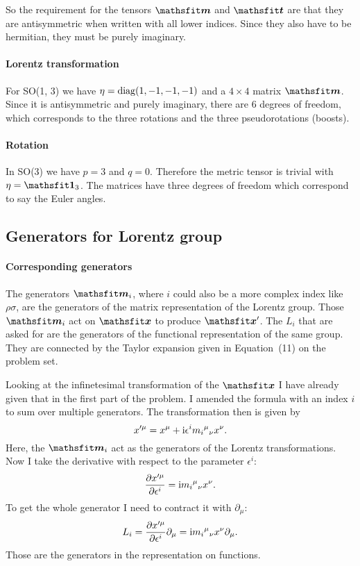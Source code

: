 \documentclass[11pt, english, fleqn, DIV=15, headinclude, BCOR=1cm]{scrartcl}
\begin{document}
So the requirement for the tensors $\tens m$ and $\tens t$ are that they are
antisymmetric when written with all lower indices. Since they also have to be
hermitian, they must be purely imaginary.

\paragraph{Lorentz transformation}

For SO(1, 3) we have $\eta = \operatorname{diag}(1, -1, -1, -1)$ and a $4\times 4$ matrix
$\tens m$. Since it is antisymmetric and purely imaginary, there are 6 degrees
of freedom, which corresponds to the three rotations and the three
pseudorotations (boosts).

\paragraph{Rotation}

In SO(3) we have $p = 3$ and $q = 0$. Therefore the metric tensor is trivial
with $\eta = \tens 1_3$. The matrices have three degrees of freedom which
correspond to say the Euler angles.

\subsection{Generators for Lorentz group}

\paragraph{Corresponding generators}

The generators $\tens m_i$, where $i$ could also be a more complex index like
$\rho\sigma$, are the generators of the matrix representation of the Lorentz
group. Those $\tens m_i$ act on $\tens x$ to produce $\tens x'$. The $L_i$ that
are asked for are the generators of the functional representation of the same
group. They are connected by the Taylor expansion given in Equation~(11) on the
problem set.

Looking at the infinetesimal transformation of the $\tens x$ I have already
given that in the first part of the problem. I amended the formula with an
index $i$ to sum over multiple generators. The transformation then is given by
\[
    x'^\mu = x^\mu + \mathrm i \epsilon^i m_i{}^\mu{}_\nu x^\nu.
\]
Here, the $\tens m_i$ act as the generators of the Lorentz transformations. Now
I take the derivative with respect to the parameter $\epsilon^i$:
\[
    \frac{\partial {x'^\mu}}{\partial {\epsilon^i}} = \mathrm i m_i{}^\mu{}_\nu x^\nu.
\]
To get the whole generator I need to contract it with $\partial_\mu$:
\[
    L_i = \frac{\partial {x'^\mu}}{\partial {\epsilon^i}} \partial_\mu
    = \mathrm i m_i{}^\mu{}_\nu x^\nu \partial_\mu.
\]
Those are the generators in the representation on functions.
\end{document}
